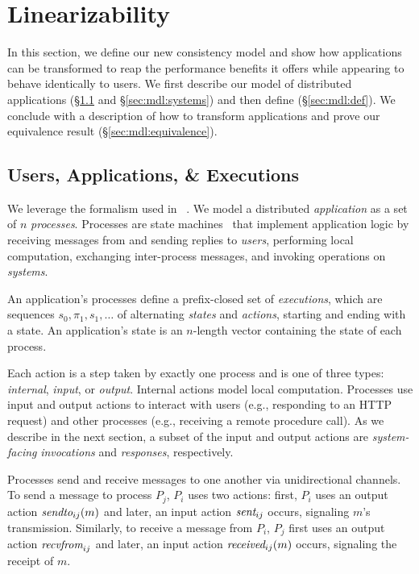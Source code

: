 \section{\Multidispatch{} Linearizability}
\label{sec:mdl}

In this section, we define our new consistency model and show how
applications can be transformed to reap the performance benefits it offers while appearing to behave identically to users.
We first describe our model of distributed applications
(\S\ref{sec:mdl:applications} and \S\ref{sec:mdl:systems}) and then define \MDL{} (\S\ref{sec:mdl:def}). We conclude with a description
of how to transform applications and prove our equivalence result
(\S\ref{sec:mdl:equivalence}).

\subsection{Users, Applications, \& Executions}
\label{sec:mdl:applications}

We leverage the formalism used in \citeauthor{helt2021rss}~\cite{helt2021rss}. We model a
distributed \textit{application} as a set of $n$ \textit{processes}.
Processes are state machines~\cite{lynch1987ioa,lynch1996da}
that implement application logic by receiving messages from and sending replies
to \textit{users}, performing local computation, exchanging inter-process
messages, and invoking operations on \textit{systems}.

An application's processes define a prefix-closed set of \textit{executions},
which are sequences $s_0,\pi_1,s_1,\ldots$ of alternating \textit{states} and
\textit{actions}, starting and ending with a state. An application's state
is an $n$-length vector containing the state of each process.

Each action is a step taken by exactly one process and is one of three types:
\textit{internal}, \textit{input}, or \textit{output}. Internal actions model
local computation. Processes use input and output actions to interact with
users (e.g., responding to an HTTP request) and other
processes (e.g., receiving a remote procedure call).
As we describe in the next section, a subset of the input and output actions
are \textit{system-facing} \textit{invocations} and \textit{responses}, 
respectively.

Processes send and receive messages to one another via unidirectional
channels. To send a message to process $P_j$, $P_i$ uses two
actions: first, $P_i$ uses an output action $\operatorname*{\operatorname*{\textit{sendto}}}_{ij}(m)$
and later, an input action $\operatorname*{\textit{sent}}_{ij}$ occurs, signaling $m$'s 
transmission. Similarly, to receive a message from $P_i$, $P_j$ first
uses an output action $\operatorname*{\textit{recvfrom}}_{ij}$ and later, an input action
$\operatorname*{\textit{received}}_{ij}(m)$ occurs, signaling the receipt of $m$.

